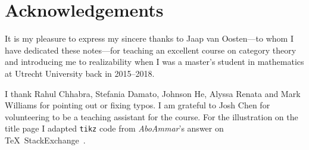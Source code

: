 \chapter{Acknowledgements}

It is my pleasure to express my sincere thanks to Jaap van Oosten---to whom I
have dedicated these notes---for teaching an excellent course on category
theory~\cite{vanOosten2016} and introducing me to realizability when I was a
master's student in mathematics at Utrecht University back in 2015--2018.

I thank Rahul Chhabra, Stefania Damato, Johnson He, Alyssa Renata and Mark
Williams for pointing out or fixing typos.
%
I am grateful to Josh Chen for volunteering to be a teaching assistant for the
course.
%
For the illustration on the title page I adapted \verb|tikz| code from
\emph{AboAmmar}'s answer on \TeX\ StackExchange~\cite{latex-triangle}.

